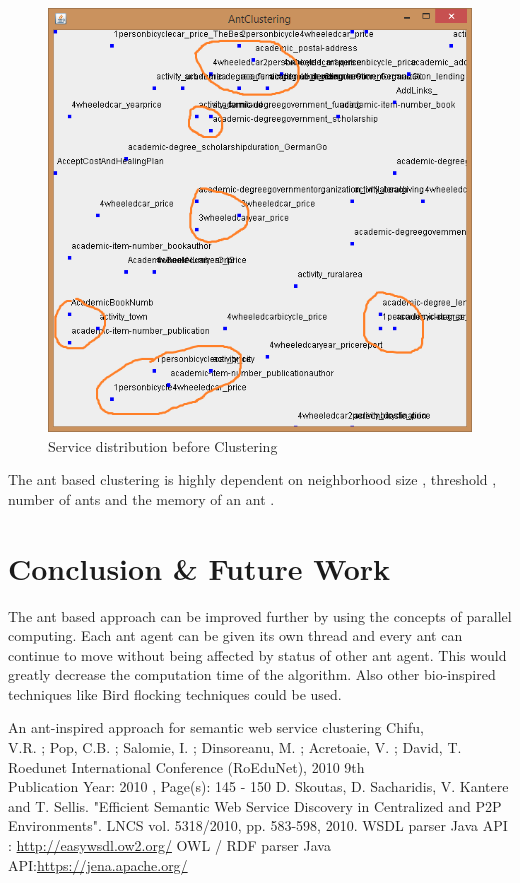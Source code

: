 \documentclass[a4paper,12pt]{article}
\begin{document}
\begin{figure}[htb]
\centering
\includegraphics[scale=1]{./final.jpg}
\caption{Service distribution before Clustering}
\label{fig:label} 
\end{figure}

The ant based clustering is highly dependent on neighborhood size , threshold , number of ants and the memory of an ant .



\newpage
\section{\fontsize{16pt}{1em} Conclusion \& Future Work}

The ant based approach can be improved further by using the concepts of parallel computing. Each ant agent can be given its own thread and every ant can continue to move without being affected by status of other ant agent. This would greatly decrease the computation time of the algorithm. Also other bio-inspired techniques like Bird flocking techniques could be used. 


\newpage

\begin{thebibliography}{9}
An ant-inspired approach for semantic web service clustering
Chifu, \\V.R. ; Pop, C.B. ; Salomie, I. ; Dinsoreanu, M. ; Acretoaie, V. ; David, T. 
\\Roedunet International Conference (RoEduNet), 2010 9th 
\\Publication Year: 2010 , Page(s): 145	- 150 
 D. Skoutas, D. Sacharidis, V. Kantere and T. Sellis. "Efficient Semantic Web Service Discovery in Centralized and P2P Environments". LNCS vol. 5318/2010, pp. 583-598, 2010. 
WSDL parser Java API : \url{http://easywsdl.ow2.org/}
OWL / RDF parser Java API:\url{https://jena.apache.org/}
\end{thebibliography}
\end{document}
